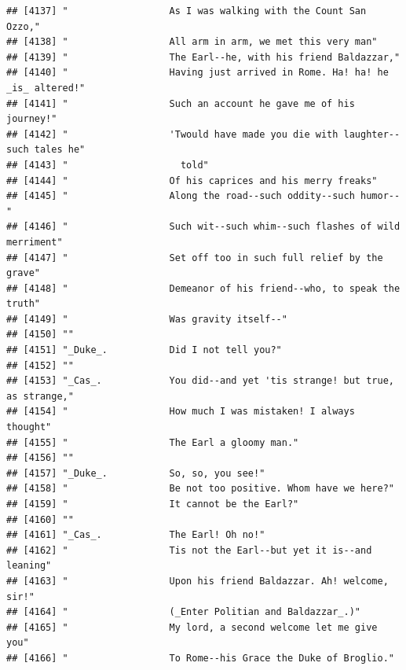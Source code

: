 \documentclass{article}\usepackage[]{graphicx}\usepackage[]{color}
\makeatletter
\newenvironment{kframe}{%
 \def\at@end@of@kframe{}%
 \ifinner\ifhmode%
  \def\at@end@of@kframe{\end{minipage}}%
  \begin{minipage}{\columnwidth}%
 \fi\fi%
 \def\FrameCommand##1{\hskip\@totalleftmargin \hskip-\fboxsep
 \colorbox{shadecolor}{##1}\hskip-\fboxsep
     \hskip-\linewidth \hskip-\@totalleftmargin \hskip\columnwidth}%
 \MakeFramed {\advance\hsize-\width
   \@totalleftmargin\z@ \linewidth\hsize
   \@setminipage}}%
 {\par\unskip\endMakeFramed%
 \at@end@of@kframe}
\newenvironment{knitrout}{}{} %
\makeatother
\begin{document}
\begin{knitrout}
\begin{kframe}
\begin{verbatim}
## [4137] "                  As I was walking with the Count San Ozzo,"                 
## [4138] "                  All arm in arm, we met this very man"                      
## [4139] "                  The Earl--he, with his friend Baldazzar,"                  
## [4140] "                  Having just arrived in Rome. Ha! ha! he _is_ altered!"     
## [4141] "                  Such an account he gave me of his journey!"                
## [4142] "                  'Twould have made you die with laughter--such tales he"    
## [4143] "                    told"                                                    
## [4144] "                  Of his caprices and his merry freaks"                      
## [4145] "                  Along the road--such oddity--such humor--"                 
## [4146] "                  Such wit--such whim--such flashes of wild merriment"       
## [4147] "                  Set off too in such full relief by the grave"              
## [4148] "                  Demeanor of his friend--who, to speak the truth"           
## [4149] "                  Was gravity itself--"                                      
## [4150] ""                                                                            
## [4151] "_Duke_.           Did I not tell you?"                                       
## [4152] ""                                                                            
## [4153] "_Cas_.            You did--and yet 'tis strange! but true, as strange,"      
## [4154] "                  How much I was mistaken! I always thought"                 
## [4155] "                  The Earl a gloomy man."                                    
## [4156] ""                                                                            
## [4157] "_Duke_.           So, so, you see!"                                          
## [4158] "                  Be not too positive. Whom have we here?"                   
## [4159] "                  It cannot be the Earl?"                                    
## [4160] ""                                                                            
## [4161] "_Cas_.            The Earl! Oh no!"                                          
## [4162] "                  Tis not the Earl--but yet it is--and leaning"              
## [4163] "                  Upon his friend Baldazzar. Ah! welcome, sir!"              
## [4164] "                  (_Enter Politian and Baldazzar_.)"                         
## [4165] "                  My lord, a second welcome let me give you"                 
## [4166] "                  To Rome--his Grace the Duke of Broglio."                   

\end{verbatim}
\end{kframe}
\end{knitrout}
\end{document}

